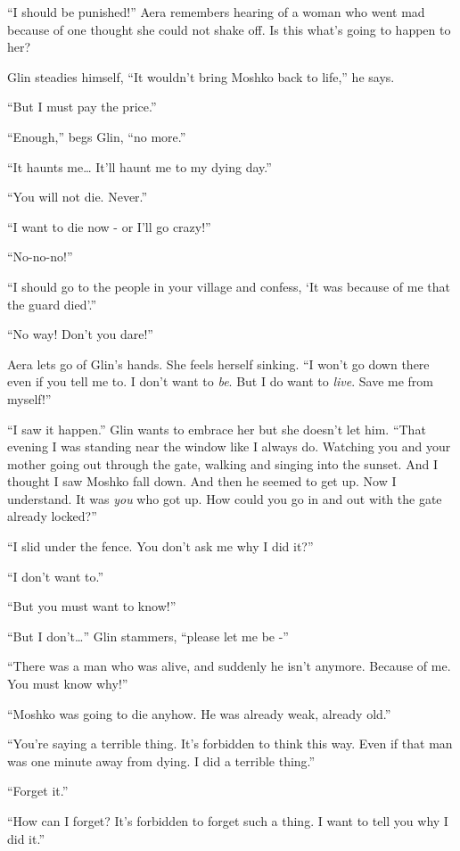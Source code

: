 \documentclass[twoside,11pt]{book}
\begin{document}
``I should be punished!'' Aera remembers hearing of a woman who went mad because of one
thought she could not shake off. Is this what's going to happen to her?

Glin steadies himself, ``It wouldn't bring Moshko back to life,'' he says.

``But I must pay the price.''

``Enough,'' begs Glin, ``no more.''

``It haunts me{\dots} It'll haunt me to my dying day.''

``You will not die. Never.''

``I want to die now - or I'll go crazy!''

``No-no-no!''

``I should go to the people in your village and confess, `It was because of me that the guard
died'.''

``No way! Don't you dare!''

Aera lets go of Glin's hands. She feels herself sinking. ``I won't go down there even if you tell me to. I
don't want to \textit{be}. But I do want to \textit{live}. Save me from myself!''

``I saw it happen.'' Glin wants to embrace her but she doesn't let him. ``That
evening I was standing near the window like I always do. Watching you and your mother going out through the gate,
walking and singing into the sunset. And I thought I saw Moshko fall down. And then he seemed to get up. Now I
understand. It was \textit{you} who got up. How could you go in and out with the gate already locked?''

``I slid under the fence. You don't ask me why I did it?''

``I don't want to.''

``But you must want to know!''

``But I don't{\dots}'' Glin stammers, ``please let me be -''

``There was a man who was alive, and suddenly he isn't anymore. Because of me. You must know
why!''

``Moshko was going to die anyhow. He was already weak, already old.''

``You're saying a terrible thing. It's forbidden to think this way. Even if that man was one minute away
from dying. I did a terrible thing.''

``Forget it.''

``How can I forget? It's forbidden to forget such a thing. I want to tell you why I did it.''
\end{document}
